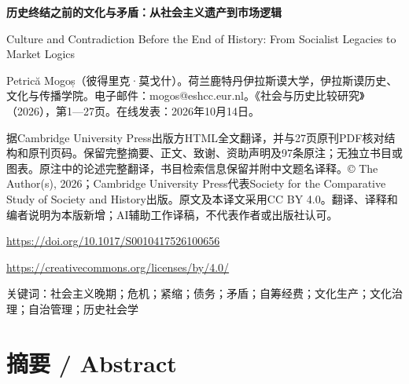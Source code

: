 \documentclass[10pt,a4paper]{article}
\begin{document}
{\Large\bfseries 历史终结之前的文化与矛盾：从社会主义遗产到市场逻辑\par}\medskip
Culture and Contradiction Before the End of History: From Socialist Legacies to Market Logics\par
Petrică Mogoș（彼得里克·莫戈什）。荷兰鹿特丹伊拉斯谟大学，伊拉斯谟历史、文化与传播学院。电子邮件：mogos@eshcc.eur.nl。《社会与历史比较研究》（2026），第1—27页。在线发表：2026年10月14日。\par
据Cambridge University Press出版方HTML全文翻译，并与27页原刊PDF核对结构和原刊页码。保留完整摘要、正文、致谢、资助声明及97条原注；无独立书目或图表。原注中的论述完整翻译，书目检索信息保留并附中文题名译释。© The Author(s), 2026；Cambridge University Press代表Society for the Comparative Study of Society and History出版。原文及本译文采用CC BY 4.0。翻译、译释和编者说明为本版新增；AI辅助工作译稿，不代表作者或出版社认可。\par
\url{https://doi.org/10.1017/S0010417526100656}\par
\url{https://creativecommons.org/licenses/by/4.0/}\par
关键词：社会主义晚期；危机；紧缩；债务；矛盾；自筹经费；文化生产；文化治理；自治管理；历史社会学\par\bigskip
{}\section*{摘要 / Abstract}
\end{document}
